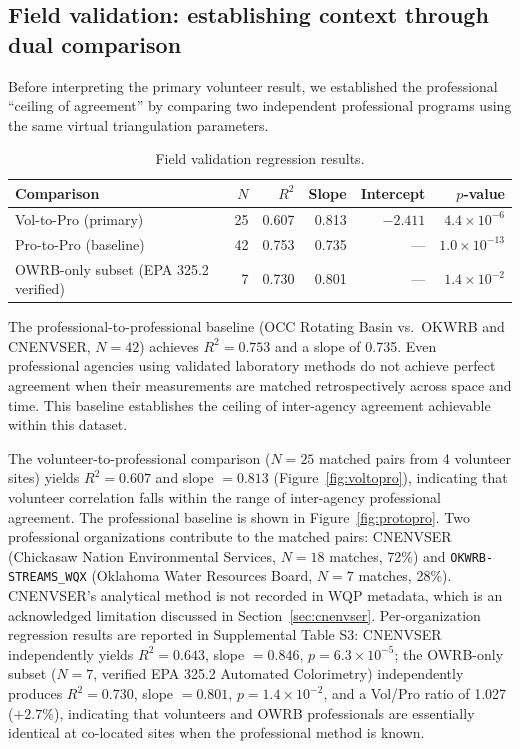 \documentclass[lineno]{wlpeerj}
\begin{document}
\subsection{Field validation: establishing context through dual comparison}
\label{sec:fieldvalidation}

Before interpreting the primary volunteer result, we established the professional ``ceiling of agreement'' by comparing two independent professional programs using the same virtual triangulation parameters.

\begin{table}[ht]
\centering
\caption{Field validation regression results.}
\label{tab:fieldvalidation}
\begin{tabular}{l r r r r r}
\toprule
Comparison & $N$ & $R^{2}$ & Slope & Intercept & $p$-value \\
\midrule
Vol-to-Pro (primary) & 25 & 0.607 & 0.813 & $-2.411$ & $4.4 \times 10^{-6}$ \\
Pro-to-Pro (baseline) & 42 & 0.753 & 0.735 & --- & $1.0 \times 10^{-13}$ \\
OWRB-only subset (EPA 325.2 verified) & 7 & 0.730 & 0.801 & --- & $1.4 \times 10^{-2}$ \\
\bottomrule
\end{tabular}
\end{table}

The professional-to-professional baseline (OCC Rotating Basin vs.\ OKWRB and CNENVSER, $N=42$) achieves $R^{2} = 0.753$ and a slope of 0.735. Even professional agencies using validated laboratory methods do not achieve perfect agreement when their measurements are matched retrospectively across space and time. This baseline establishes the ceiling of inter-agency agreement achievable within this dataset.

The volunteer-to-professional comparison ($N=25$ matched pairs from 4 volunteer sites) yields $R^{2} = 0.607$ and slope $= 0.813$ (Figure~\ref{fig:voltopro}), indicating that volunteer correlation falls within the range of inter-agency professional agreement. The professional baseline is shown in Figure~\ref{fig:protopro}. Two professional organizations contribute to the matched pairs: CNENVSER (Chickasaw Nation Environmental Services, $N=18$ matches, 72\%) and \texttt{OKWRB-STREAMS\_WQX} (Oklahoma Water Resources Board, $N=7$ matches, 28\%). CNENVSER's analytical method is not recorded in WQP metadata, which is an acknowledged limitation discussed in Section~\ref{sec:cnenvser}. Per-organization regression results are reported in Supplemental Table S3: CNENVSER independently yields $R^{2} = 0.643$, slope $= 0.846$, $p = 6.3 \times 10^{-5}$; the OWRB-only subset ($N=7$, verified EPA 325.2 Automated Colorimetry) independently produces $R^{2} = 0.730$, slope $= 0.801$, $p = 1.4 \times 10^{-2}$, and a Vol/Pro ratio of 1.027 ($+2.7\%$), indicating that volunteers and OWRB professionals are essentially identical at co-located sites when the professional method is known.
\end{document}
